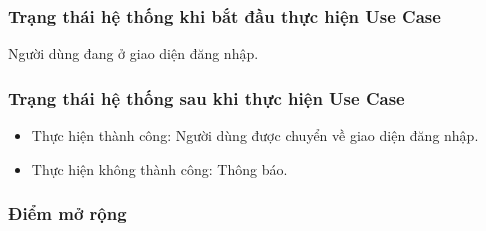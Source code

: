 \subsubsection{Trạng thái hệ thống khi bắt đầu thực hiện Use Case}
Người dùng đang ở giao diện đăng nhập.

\subsubsection{Trạng thái hệ thống sau khi thực hiện Use Case}
\begin{itemize}
    \item Thực hiện thành công: Người dùng được chuyển về giao diện đăng nhập.
    \item Thực hiện không thành công: Thông báo.
\end{itemize}

\subsubsection{Điểm mở rộng}